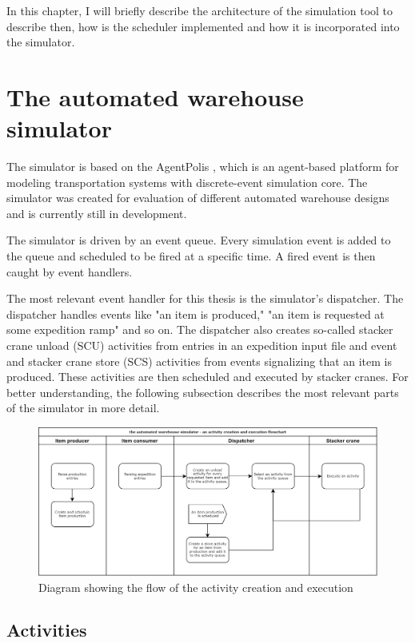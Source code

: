 \documentclass{ctuthesis}
\begin{document}
 In this chapter, I will briefly describe the architecture of the simulation tool to describe then, how is the scheduler implemented and how it is incorporated into the simulator.

\section{The automated warehouse simulator}

 The simulator is based on the AgentPolis \cite{agentpolis}, which is an agent-based platform for modeling transportation systems with discrete-event simulation core. The simulator was created for evaluation of different automated warehouse designs and is currently still in development.
 
 The simulator is driven by an event queue. Every simulation event is added to the queue and scheduled to be fired at a specific time. A fired event is then caught by event handlers. 
 
 The most relevant event handler for this thesis is the simulator's dispatcher. The dispatcher handles events like "an item is produced," "an item is requested at some expedition ramp" and so on. The dispatcher also creates so-called stacker crane unload (SCU) activities from entries in an expedition input file and event and stacker crane store (SCS) activities from events signalizing that an item is produced. These activities are then scheduled and executed by stacker cranes. For better understanding, the following subsection describes the most relevant parts of the simulator in more detail.
 
\begin{figure}[H]
\includegraphics[width=1\linewidth]{flowchart2.png}
\caption{Diagram showing the flow of the activity creation and execution}
\label{flowchart1}
\end{figure}

\subsection{Activities}
\end{document}
